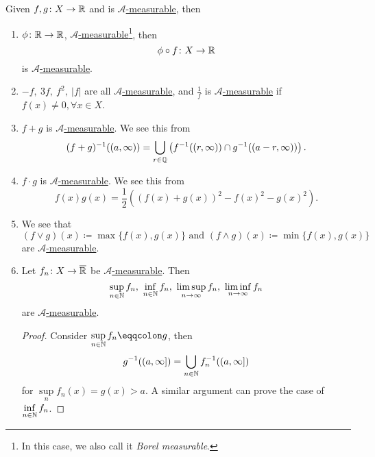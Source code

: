 \begin{property}
	Given \(f, g\colon X\to \mathbb{\MakeUppercase{r}} \) and is \hyperref[def:A-measurable-function]{\(\mathcal{A}\)-measurable}, then
	\begin{enumerate}
		\item \(\phi \colon \mathbb{\MakeUppercase{r}} \to \mathbb{\MakeUppercase{r}} \), \hyperref[def:A-measurable-function]{\(\mathcal{A}\)-measurable}\footnote{\label{def:Borel-measurable}In this case, we also call it \emph{Borel measurable}.}, then
		      \[
			      \phi \circ f\colon X\to \mathbb{\MakeUppercase{r}}
		      \]
		      is \hyperref[def:A-measurable-function]{\(\mathcal{A}\)-measurable}.
		\item \(-f,\ 3f,\ f^2,\ \left\vert f \right\vert \) are all \hyperref[def:A-measurable-function]{\(\mathcal{A} \)-measurable}, and \(\frac{1}{f}\) is
		      \hyperref[def:A-measurable-function]{\(\mathcal{A}\)-measurable} if \(f(x)\neq 0, \forall x\in X\).
		\item \(f+g\) is \hyperref[def:A-measurable-function]{\(\mathcal{A}\)-measurable}. We see this from
		      \[
			      (f+g)^{-1} ((a, \infty ))=\bigcup\limits_{r\in\mathbb{\MakeUppercase{q}}} \left(f^{-1} ((r, \infty ))\cap g^{-1} ((a-r, \infty ))\right).
		      \]
		\item \(f\cdot g\) is \hyperref[def:A-measurable-function]{\(\mathcal{A}\)-measurable}. We see this from
		      \[
			      f(x)g(x) = \frac{1}{2}\left((f(x)+g(x))^2 - f(x)^2 - g(x)^2\right).
		      \]
		\item We see that
		      \[
			      (f\vee g)(x)\coloneqq \max \{f(x), g(x)\}\text{ and }(f\wedge g)(x)\coloneqq \min\{f(x), g(x)\}
		      \]
		      are \hyperref[def:A-measurable-function]{\(\mathcal{A}\)-measurable}.
		\item Let \(f_{n}\colon X\to \overline{\mathbb{\MakeUppercase{r}} }\) be \hyperref[def:A-measurable-function]{\(\mathcal{A}\)-measurable}. Then
		      \[
			      \sup\limits_{n\in\mathbb{\MakeUppercase{n}} } f_{n},\ \inf\limits_{n\in\mathbb{\MakeUppercase{n}} } f_{n},\ \limsup\limits_{n\to \infty} f_{n},\ \liminf\limits_{n\to \infty} f_{n}
		      \]
		      are \hyperref[def:A-measurable-function]{\(\mathcal{A}\)-measurable}.
		      \begin{proof}
			      Consider \(\sup\limits_{n\in\mathbb{\MakeUppercase{n}} } f_{n} \eqqcolon g\), then
			      \[
				      g^{-1} ((a, \infty ]) = \bigcup\limits_{n\in\mathbb{\MakeUppercase{n}}} f_{n}^{-1} ((a, \infty ])
			      \]
			      for \(\sup\limits_n f_{n}(x) = g(x)>a\). A similar argument can prove the case of \(\inf\limits_{n\in\mathbb{\MakeUppercase{n}} } f_{n}\).


\end{proof}
\end{enumerate}
\end{property}

